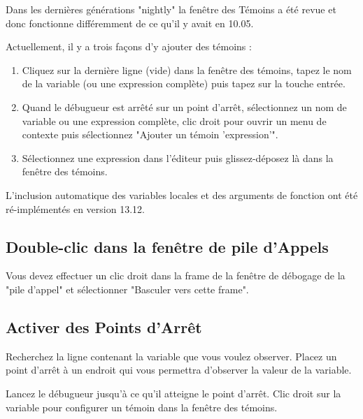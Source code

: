 Dans les dernières générations "nightly" la fenêtre des Témoins a été revue et donc fonctionne différemment de ce qu'il y avait en 10.05.

Actuellement, il y a trois façons d'y ajouter des témoins :

\begin{enumerate}
\item Cliquez sur la dernière ligne (vide) dans la fenêtre des témoins, tapez le nom de la variable (ou une expression complète) puis tapez sur la touche entrée.
\item Quand le débugueur est arrêté sur un point d'arrêt, sélectionnez un nom de variable ou une expression complète, clic droit pour ouvrir un menu de contexte puis sélectionnez "Ajouter un témoin 'expression'".
\item Sélectionnez une expression dans l'éditeur puis glissez-déposez là dans la fenêtre des témoins.
\end{enumerate}

L'inclusion automatique des variables locales et des arguments de fonction ont été ré-implémentés en version 13.12. 

\subsection{Double-clic dans la fenêtre de pile d'Appels}

Vous devez effectuer un clic droit dans la frame de la fenêtre de débogage de la "pile d'appel" et sélectionner "Basculer vers cette frame". 

\subsection{Activer des Points d'Arrêt}

Recherchez la ligne contenant la variable que vous voulez observer. Placez un point d'arrêt à un endroit qui vous permettra d'observer la valeur de la variable.

Lancez le débugueur jusqu'à ce qu'il atteigne le point d'arrêt. Clic droit sur la variable pour configurer un témoin dans la fenêtre des témoins.

